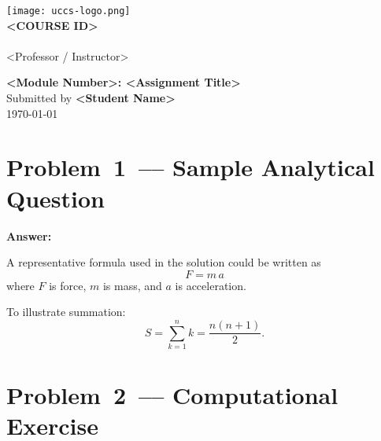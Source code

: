 \documentclass[12pt]{article}
\newenvironment{problem}{\color{dodblue}\itshape}{\par}
\begin{document}
\begin{center}
    \texttt{[image: uccs-logo.png]}\\[8\baselineskip]

    {\HeadingFont\fontsize{24}{26}\selectfont\textbf{<COURSE ID>}}\\[0.25\baselineskip]
    {}\\[0.15\baselineskip]
    {\small <Professor / Instructor>}\\[2\baselineskip]
\vfill

    {\HeadingFont\fontsize{20}{22}\selectfont\textbf{<Module Number>: <Assignment Title>}}\\[0.5\baselineskip]
    {Submitted by \textbf{<Student Name>}}\\[0.15\baselineskip]
    {\today}
\end{center}

\newpage

\section*{Problem 1 –– Sample Analytical Question}
\begin{problem}
\lipsum[1]
\end{problem}

\textbf{Answer:}\\
\lipsum[2]

A representative formula used in the solution could be written as
\begin{equation}\label{eq:newton}
F = m\,a
\end{equation}
where $F$ is force, $m$ is mass, and $a$ is acceleration.

To illustrate summation:
\begin{equation}
S = \sum_{k=1}^{n} k = \frac{n(n+1)}{2}.
\end{equation}

\section*{Problem 2 –– Computational Exercise}
\begin{problem}
\lipsum[3]
\end{problem}
\end{document}
